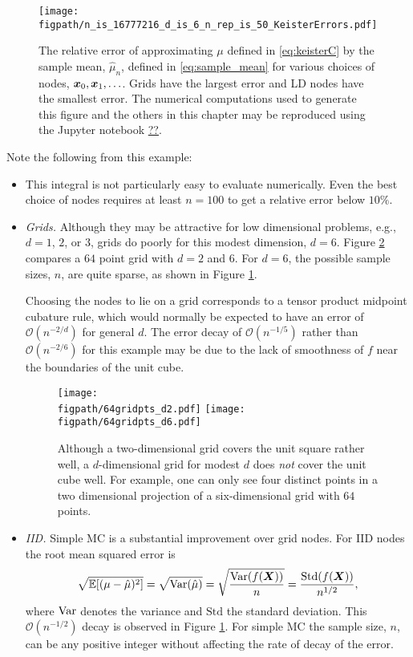 \documentclass{svproc}
\newcommand{\figpath}{Figures}
\begin{document}
\begin{figure}
	\centering
	\texttt{[image: \\figpath/n\_is\_16777216\_d\_is\_6\_n\_rep\_is\_50\_KeisterErrors.pdf]}
	\caption{The relative error of approximating $\mu$ defined in \eqref{eq:keisterC} by the sample mean, $\hat{\mu}_n$, defined in \eqref{eq:sample_mean} for various choices of nodes, ${\boldsymbol{x}}_0, {\boldsymbol{x}}_1, \ldots$.  Grids have the largest error and LD nodes have the smallest error. The numerical computations used to generate this figure and the others in this chapter may be reproduced using the Jupyter notebook \url{??}. \label{fig:keister-err}}
\end{figure}

Note the following from this example:
\begin{itemize}
	\item This integral is not particularly easy to evaluate numerically.  Even the best choice of nodes requires at least $n=100$ to get a relative error below $10\%$.

	\item \emph{Grids.} Although they may be attractive for low dimensional problems, e.g., $d = 1$, $2$, or $3$, grids do poorly for this modest dimension, $d=6$.  Figure \ref{fig:grid} compares a $64$ point grid with $d = 2$ and $6$.  For $d = 6$, the possible sample sizes, $n$, are quite sparse, as shown in Figure \ref{fig:keister-err}.

	Choosing the nodes to lie on a grid corresponds to a tensor product midpoint cubature rule, which would normally be expected to have an error of $\mathcal{O}(n^{-2/d})$  for general $d$.  The error decay of $\mathcal{O}(n^{-1/5})$ rather than $\mathcal{O}(n^{-2/6})$ for this example may be due to the lack of smoothness of $f$ near the boundaries of the unit cube.
\begin{figure}
	\centering
	\texttt{[image: \\figpath/64gridpts\_d2.pdf]}\qquad
	\texttt{[image: \\figpath/64gridpts\_d6.pdf]}
	\caption{Although a two-dimensional grid covers the unit square rather well, a $d$-dimensional grid for modest $d$ does \emph{not} cover the unit cube well.  For example, one can only see four distinct points in a two dimensional projection of a six-dimensional grid with $64$ points. \label{fig:grid}}
\end{figure}

	\item \emph{IID.}  Simple MC is a substantial improvement over grid nodes. For IID nodes the root mean squared error is
	\begin{equation}\label{eq:IIDerror}
		\sqrt{\mathbb{E}[(\mu - \hat{\mu})^2]} = \sqrt{\operatorname{Var}(\hat{\mu})} = \sqrt{\frac{\operatorname{Var}(f({\boldsymbol{X}}))}{n}} = \frac{\mathrm{Std}(f({\boldsymbol{X}}))}{n^{1/2}},
	\end{equation}
	where $\operatorname{Var}$ denotes the variance and $\mathrm{Std}$ the standard deviation.  This $\mathcal{O}(n^{-1/2})$ decay is observed in Figure \ref{fig:keister-err}. For simple MC the sample size, $n$, can be any positive integer without affecting the rate of decay of the error.


\end{itemize}
\end{document}
